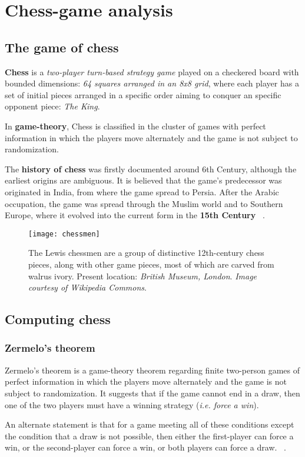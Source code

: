\chapter{Chess-game analysis}

\section{The game of chess}

\textbf{Chess} is a \textit{two-player turn-based strategy game} played on a checkered board with bounded dimensions: \textit{64 squares arranged in an 8x8 grid}, where each player has a set of initial pieces arranged in a specific order aiming to conquer an specific opponent piece: \textit{The King}.

In \textbf{game-theory}, Chess is classified in the cluster of games with perfect information in which the players move alternately and the game is not subject to randomization.

The \textbf{history of chess} was firstly documented around 6th Century, although the earliest origins are ambiguous. It is believed that the game's predecessor was originated in India, from where the game spread to Persia. After the Arabic occupation, the game was spread through the Muslim world and to Southern Europe, where it evolved into the current form in the \textbf{15th Century} ~\cite{murray1913history}.


    \begin{figure}[H]
        \centering
        \texttt{[image: chessmen]}
        \caption{The Lewis chessmen are a group of distinctive 12th-century chess pieces, along with other game pieces, most of which are carved from walrus ivory. Present location: \textit{British Museum, London}. \textit{Image courtesy of Wikipedia Commons}.}
    \end{figure}

\section{Computing chess}

\subsection{Zermelo's theorem}

\begin{theorem} 
Zermelo's theorem is a game-theory theorem regarding finite two-person games of perfect information in which the players move alternately and the game is not subject to randomization. It suggests that if the game cannot end in a draw, then one of the two players must have a winning strategy (\textit{i.e. force a win}). 

An alternate statement is that for a game meeting all of these conditions except the condition that a draw is not possible, then either the first-player can force a win, or the second-player can force a win, or both players can force a draw. ~\cite{schwalbe2001zermelo}. 
\end{theorem}

